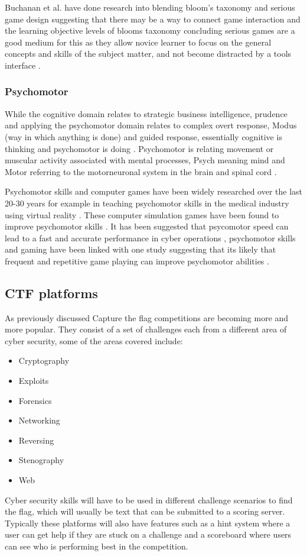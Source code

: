 \documentclass[12pt,a4paper]{article}
\begin{document}
Buchanan et al. have done research into blending bloom's taxonomy and serious game design suggesting that there may be a way to connect game interaction and the learning objective levels of blooms taxonomy concluding serious games are a good medium for this as they allow novice learner to focus on the general concepts and skills of the subject matter, and not become distracted by a tools interface \cite{buchanan2011blending2}. 
\subsubsection{Psychomotor} 
While the cognitive domain relates to strategic business intelligence, prudence and applying the psychomotor domain relates to complex overt response, Modus (way in which anything is done) and guided response, essentially cognitive is thinking and psychomotor is doing \cite{schutte2016development}. Psychomotor is relating movement or muscular activity associated with mental processes, Psych meaning mind and Motor referring to the motorneuronal system in the brain and spinal cord \cite{tan2007psychomotor}. 
 
Psychomotor skills and computer games have been widely researched over the last 20-30 years for example in teaching psychomotor skills in the medical industry using virtual reality \cite{westwood1998validation} \cite{gallagher2001objective} \cite{gallagher2002virtual} \cite{grantcharov2004randomized} \cite{lehmann2005prospective}. These computer simulation games have been found to improve psychomotor skills \cite{mitchell2004use}. It has been suggested that psycomotor speed can lead to a fast and accurate performance in cyber operations \cite{campbell2015identifying}, psychomotor skills and gaming have been linked with one study suggesting that its likely that frequent and repetitive game playing can improve psychomotor abilities \cite{kennedy2011video}.



\subsection{CTF platforms}
As previously discussed Capture the flag competitions are becoming more and more popular. They consist of a set of challenges each from a different area of cyber security, some of the areas covered include: 
\begin{itemize}
  \item Cryptography
  \item Exploits 
  \item Forensics 
  \item Networking 
  \item Reversing 
  \item Stenography  
  \item Web
\end{itemize}
Cyber security skills will have to be used in different challenge scenarios to find the flag, which will usually be text that can be submitted to a scoring server\cite{burket2015automatic}. Typically these platforms will also have features such as a hint system where a user can get help if they are stuck on a challenge and a scoreboard where users can see who is performing best in the competition.   
\end{document}
